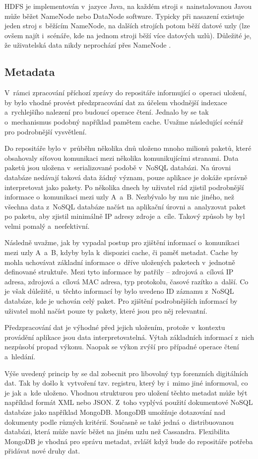 HDFS je implementován v~jazyce Java, na každém stroji s~nainstalovanou Javou může běžet NameNode nebo DataNode software. Typicky při nasazení existuje jeden stroj s~běžícím NameNode, na dalších strojích potom běží datové uzly (lze ovšem najít i~scénáře, kde na jednom stroji běží více datových uzlů). Důležité je, že uživatelská data nikdy neprochází přes NameNode \cite{apacheHDFSGuide}.

\subsection{Metadata} \label{metadata}
V~rámci zpracování příchozí zprávy do repositáře informující o~operaci uložení, by bylo vhodné provést předzpracování dat za účelem vhodnější indexace a~rychlejšího nalezení pro budoucí operace čtení. Jednalo by se tak o~mechanismus podobný například pamětem cache. Uvažme následující scénář pro podrobnější vysvětlení.

Do repositáře bylo v~průběhu několika dnů uloženo mnoho milionů paketů, které obsahovaly síťovou komunikaci mezi několika komunikujícími stranami. Data paketů jsou uložena v~serializované podobě v~NoSQL databázi. Na úrovni databáze nedávají taková data žádný význam, pouze aplikace je dokáže správně interpretovat jako pakety. Po několika dnech by uživatel rád zjistil podrobnější informace o~komunikaci mezi uzly A~a~B. Nezbývalo by mu nic jiného, než všechna data z~NoSQL databáze načíst na aplikační úrovni a~analyzovat paket po paketu, aby zjistil minimálně IP adresy zdroje a~cíle. Takový způsob by byl velmi pomalý a~neefektivní.

Následně uvažme, jak by vypadal postup pro zjištění informací o~komunikaci mezi uzly A~a~B, kdyby byla k~dispozici cache, či paměť metadat. Cache by mohla uchovávat základní informace o~dříve uložených paketech v~jednotně definované struktuře. Mezi tyto informace by patřily -- zdrojová a~cílová IP adresa, zdrojová a~cílová MAC adresa, typ protokolu, časové razítko a~další. Co je však důležité, u~těchto informací by bylo uvedeno ID záznamu z~NoSQL databáze, kde je uchován celý paket. Pro zjištění podrobnějších informací by uživatel mohl načíst pouze ty pakety, které jsou pro něj relevantní.

Předzpracování dat je výhodné před jejich uložením, protože v~kontextu provádění aplikace jsou data interpretovatelná. Výtah základních informací z~nich nezpůsobí propad výkonu. Naopak se výkon zvýší pro případné operace čtení a~hledání.

Výše uvedený princip by se dal zobecnit pro libovolný typ forenzních digitálních dat. Tak by došlo k~vytvoření tzv. registru, který by i~mimo jiné informoval, co je jak a~kde uloženo. Vhodnou strukturou pro uložení těchto metadat může být například formát XML nebo JSON. Z~toho vyplývá použití dokumentové NoSQL databáze jako například MongoDB. MongoDB umožňuje dotazování nad dokumenty podle různých kritérií. Současně se také jedná o~distribuovanou databázi, která může navíc běžet na jiném uzlu než Cassandra. Flexibilita MongoDB je vhodná pro správu metadat, zvlášť když bude do repositáře potřeba přidávat nové druhy dat.


